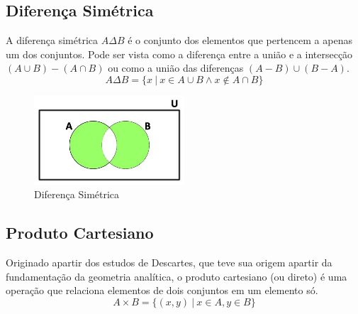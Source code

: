 \subsection*{Diferença Simétrica}
A diferença simétrica $A \Delta B$ é o conjunto dos elementos que pertencem a apenas um dos conjuntos. Pode ser vista como a diferença entre a união e a intersecção $(A \cup B) - (A \cap B)$ ou como a união das diferenças $(A-B) \cup (B-A)$.
\[A \Delta B= \{x \: | \: x \in A \cup B \wedge x \not \in A \cap B\}\]
\begin{figure}[H]
  \caption{Diferença Simétrica}
  \centering
  \includegraphics[width=0.5\textwidth]{algebra/imagens/difsim}
\end{figure}

\subsection*{Produto Cartesiano}
Originado apartir dos estudos de Descartes, que teve sua origem apartir da fundamentação da geometria analítica, o produto cartesiano (ou direto) é uma operação que relaciona  elementos de dois conjuntos em um elemento só.
\[A \times B = \{(x,y) \: | \: x \in A, y \in B\}\]